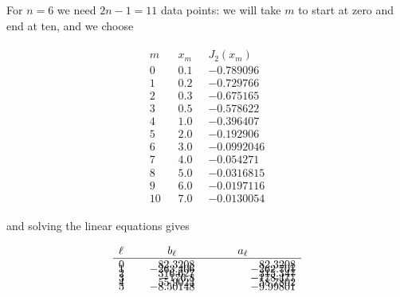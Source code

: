 \documentclass[preprint,12pt,eqsecnum,nofootinbib,amsmath,amssymb]{revtex4}
\begin{document}
\noindent
For $n=6$ we need $2n-1=11$ data points: we will take
$m$ to start at zero and end at ten, and we choose 
\vskip-0.8cm

\vbox{
\begin{eqnarray}
\begin{array}{lll}
  m~~~~ & x_m~~~   & J_2(x_m)       \\ \hline
  0    & 0.1       &  -0.789096     \\[-8pt]
  1    & 0.2       &  -0.729766     \\[-8pt]
  2    & 0.3       &  -0.675165     \\[-8pt]
  3    & 0.5       &  -0.578622     \\[-8pt]
  4    & 1.0       &  -0.396407     \\[-8pt]
  5    & 2.0       &  -0.192906     \\[-8pt]
  6    & 3.0       &  -0.0992046    \\[-8pt]
  7    & 4.0       &  -0.054271     \\[-8pt]
  8    & 5.0       &  -0.0316815    \\[-8pt]
  9    & 6.0       &  -0.0197116    \\[-8pt]
 10    & 7.0       &  -0.0130054 
\end{array}
\end{eqnarray}
}
%

\noindent
and solving the linear equations gives
\vskip-0.2cm

\vbox{
\begin{eqnarray}
  \begin{array}{lrr}
  \ell~~~~ & \hfill b_\ell \hfill & \hskip1cm a_\ell \hskip1.5cm  \\ \hline
  0    &    82.3208      &    82.3208    \\[-8pt]
  1    &   -263.406      &   -262.701    \\[-8pt]
  2    &    316.627      &    315.347    \\[-8pt]
  3    &     -176.8      &   -178.477    \\[-8pt]
  4    &    55.9024      &    58.7802    \\[-8pt]
  5    &   -8.50148      &   -9.99801    \\[-8pt]
  \end{array}
\end{eqnarray}
}
\end{document}
